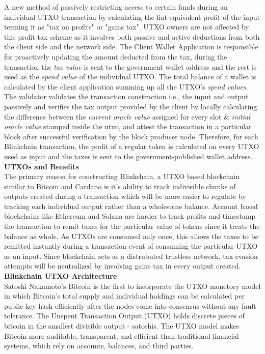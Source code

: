 \documentclass[letterpaper,11pt]{article}
\begin{document}
A new method of passively restricting  access to certain funds during  an individual UTXO transaction by calculating the fiat-equivalent profit of the input terming it as "tax on profits" or "gains tax". UTXO owners are not affected by this profit tax scheme as it involves both  passive and active deductions from both the client side and the network side. The Client Wallet Application  is responsible for proactively updating the amount deducted from the tax, during the transaction the \textit{tax value} is sent to the government wallet address and the rest is used as the \textit{spend value} of the individual UTXO. The total balance of a wallet is calculated by the client application summing up all the UTXO's \textit{spend values}. The validator validates the transaction construction i.e., the input and output passively and verifies the tax output provided by the client by locally calculating the difference between the \textit{current oracle value} assigned for every slot \& \textit{initial oracle value} stamped inside the utxo, and attest the transaction in a particular block after successful verification by the block producer node. Therefore, for each Blinkchain transaction, the profit of a regular token is calculated on every UTXO used as input and the taxes is sent  to the government-published wallet address.\\

\textbf{UTXOs and Benefits}\\


The primary reason for constructing Blinkchain, a UTXO based blockchain similar to Bitcoin and Cardano is it's ability to track indivisible chunks of outputs created during a transaction which will be more easier to regulate by tracking each individual output rather than a wholesome balance. Account based blockchains like Ethereum and Solana are harder to track profits and timestamp the transaction to remit taxes for the particular value of tokens since it treats the balance as whole. As UTXOs are consumed only once, this allows the taxes to be remitted instantly during a transaction event of consuming the particular UTXO as an input. Since blockchain acts as a distrubuted trustless network, tax evasion attempts will be neutralized by involving gains tax in every output created.\\

\textbf{Blinkchain UTXO Architecture}\\

Satoshi Nakamoto's Bitcoin is the first to incorporate the UTXO monetory model in which Bitcoin's total supply and individual holdings can be calculated per public key hash efficiently after the nodes come into consensus without any fault tolerance. The Unspent Transaction Output (UTXO) holds discrete pieces of bitcoin in the smallest divisible output - satoshis. The UTXO model makes Bitcoin more auditable, transparent, and efficient than traditional financial systems, which rely on accounts, balances, and third parties. \\
\end{document}
